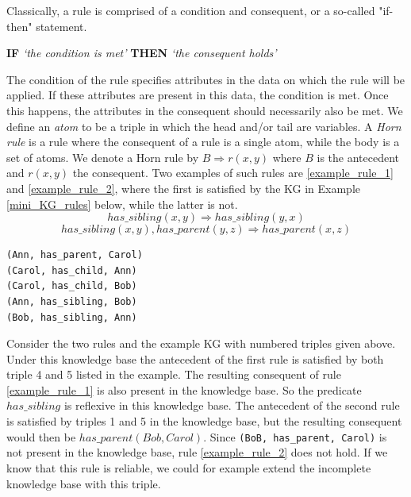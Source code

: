 Classically, a rule is comprised of a condition and consequent, or a so-called "if-then" statement. \begin{center} \textbf{IF} \textit{`the condition is met'} \textbf{THEN} \textit{`the consequent holds'} \end{center}
The condition of the rule specifies attributes in the data on which the rule will be applied. If these attributes are present in this data, the condition is met. Once this happens, the attributes in the consequent should necessarily also be met. We define an \textit{atom} to be a triple in which the head and/or tail are variables. A \textit{Horn rule} is a rule where the consequent of a rule is a single atom, while the body is a set of atoms. We denote a Horn rule by $B \Rightarrow r(x, y)$ where $B$ is the antecedent and $r(x, y)$ the consequent. Two examples of such rules are \ref{example_rule_1} and \ref{example_rule_2}, where the first is satisfied by the KG in Example \ref{mini_KG_rules} below, while the latter is not.
\begin{equation}
has\_sibling(x, y) \Rightarrow has\_sibling(y,x)
\label{example_rule_1}
\end{equation}
\begin{equation}
    has\_sibling(x, y), has\_parent(y,z) \Rightarrow has\_parent(x,z)
    \label{example_rule_2}
\end{equation}


\begin{example}[A simple KG.]
\begin{lstlisting}[]
(Ann, has_parent, Carol)
(Carol, has_child, Ann)
(Carol, has_child, Bob)
(Ann, has_sibling, Bob)
(Bob, has_sibling, Ann)
\end{lstlisting}
\label{mini_KG_rules}
\end{example}


Consider the two rules and the example KG with numbered triples given above. Under this knowledge base the antecedent of the first rule is satisfied by both triple 4 and 5 listed in the example. The resulting consequent of rule \ref{example_rule_1} is also present in the knowledge base. So the predicate $has\_sibling$ is reflexive in this knowledge base. The antecedent of the second rule is satisfied by triples 1 and 5 in the knowledge base, but the resulting consequent would then be $has\_parent(Bob, Carol)$. Since \texttt{(BoB, has\_parent, Carol)} is not present in the knowledge base, rule \ref{example_rule_2} does not hold. If we know that this rule is reliable, we could for example extend the incomplete knowledge base with this triple.

